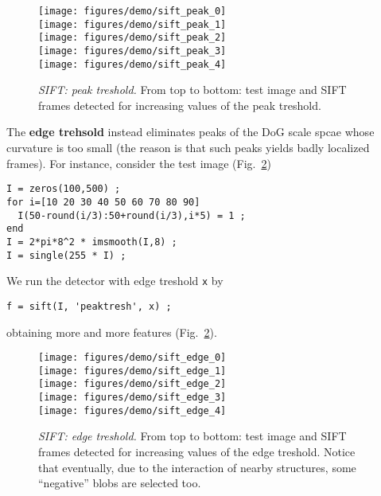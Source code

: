 \documentclass{article}
\begin{document}
\begin{figure}
\begin{center}
\texttt{[image: figures/demo/sift\_peak\_0]}\\
\texttt{[image: figures/demo/sift\_peak\_1]}\\
\texttt{[image: figures/demo/sift\_peak\_2]}\\
\texttt{[image: figures/demo/sift\_peak\_3]}\\
\texttt{[image: figures/demo/sift\_peak\_4]}
\end{center}
\caption{{\em SIFT: peak treshold.} From top to bottom: test image and
  SIFT frames detected for increasing values of the peak treshold.}
\label{fig:sift-peak-tresh}
\end{figure}

The {\bf edge trehsold} instead eliminates peaks of the DoG scale
spcae whose curvature is too small (the reason is that such peaks
yields badly localized frames). For instance, consider the test image
(Fig.~\ref{fig:sift-edge-tresh})
\begin{verbatim}
I = zeros(100,500) ;
for i=[10 20 30 40 50 60 70 80 90]
  I(50-round(i/3):50+round(i/3),i*5) = 1 ;
end
I = 2*pi*8^2 * imsmooth(I,8) ;
I = single(255 * I) ;
\end{verbatim}
We run the detector with edge treshold \verb$x$ by
\begin{verbatim}
f = sift(I, 'peaktresh', x) ;
\end{verbatim}
obtaining more and more features (Fig.~\ref{fig:sift-edge-tresh}).

\begin{figure}
\begin{center}
\texttt{[image: figures/demo/sift\_edge\_0]}\\
\texttt{[image: figures/demo/sift\_edge\_1]}\\
\texttt{[image: figures/demo/sift\_edge\_2]}\\
\texttt{[image: figures/demo/sift\_edge\_3]}\\
\texttt{[image: figures/demo/sift\_edge\_4]}
\end{center}
\caption{{\em SIFT: edge treshold.} From top to bottom: test image and
  SIFT frames detected for increasing values of the edge
  treshold. Notice that eventually, due to the interaction of nearby
  structures, some ``negative'' blobs are selected too.}
\label{fig:sift-edge-tresh}
\end{figure}
\end{document}
